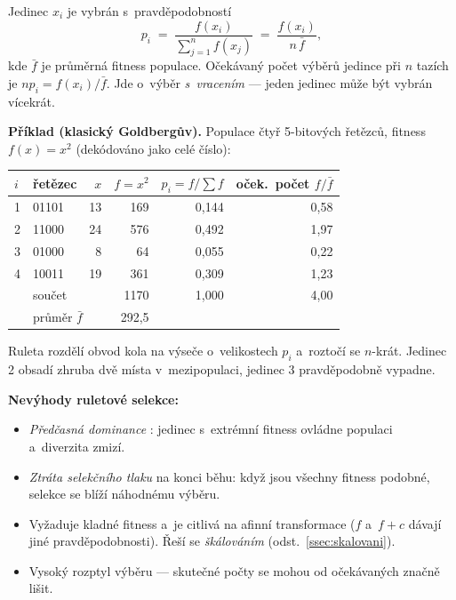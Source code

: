 \documentclass[11pt,a4paper]{article}
\theoremstyle{definition}
\begin{document}
\begin{defbox}
Jedinec $x_i$ je vybrán s~pravděpodobností
\[
p_i \;=\; \frac{f(x_i)}{\sum_{j=1}^{n} f(x_j)} \;=\; \frac{f(x_i)}{n\,\bar{f}},
\]
kde $\bar f$ je průměrná fitness populace. Očekávaný počet výběrů jedince při
$n$ tazích je $n p_i = f(x_i)/\bar f$. Jde o~výběr \emph{s~vracením} --- jeden
jedinec může být vybrán vícekrát.
\end{defbox}

\textbf{Příklad (klasický Goldbergův).}\label{ex:goldberg} Populace čtyř
5-bitových řetězců, fitness $f(x) = x^2$ (dekódováno jako celé číslo):

\begin{center}
\begin{tabular}{@{}llrrrr@{}}
\toprule
$i$ & řetězec & $x$ & $f=x^2$ & $p_i = f/\sum f$ & oček.\ počet $f/\bar f$ \\
\midrule
1 & 01101 & 13 & 169 & 0{,}144 & 0{,}58 \\
2 & 11000 & 24 & 576 & 0{,}492 & 1{,}97 \\
3 & 01000 &  8 &  64 & 0{,}055 & 0{,}22 \\
4 & 10011 & 19 & 361 & 0{,}309 & 1{,}23 \\
\midrule
  & \multicolumn{2}{l}{součet} & 1170 & 1{,}000 & 4{,}00 \\
  & \multicolumn{2}{l}{průměr $\bar f$} & 292{,}5 & & \\
\bottomrule
\end{tabular}
\end{center}

Ruleta rozdělí obvod kola na výseče o~velikostech $p_i$ a~roztočí se $n$-krát.
Jedinec 2 obsadí zhruba dvě místa v~mezipopulaci, jedinec 3 pravděpodobně
vypadne.

\textbf{Nevýhody ruletové selekce:}
\begin{itemize}
\item \emph{Předčasná dominance} : jedinec s~extrémní fitness
  ovládne populaci a~diverzita zmizí.
\item \emph{Ztráta selekčního tlaku} na konci běhu: když jsou všechny fitness
  podobné, selekce se blíží náhodnému výběru.
\item Vyžaduje kladné fitness a~je citlivá na afinní transformace
  ($f$ a~$f + c$ dávají jiné pravděpodobnosti). Řeší se \emph{škálováním}
  (odst.~\ref{ssec:skalovani}).
\item Vysoký rozptyl výběru --- skutečné počty se mohou od očekávaných značně lišit.
\end{itemize}
\end{document}
